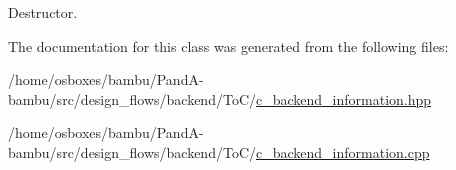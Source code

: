 Destructor. 



The documentation for this class was generated from the following files\+:\begin{DoxyCompactItemize}
\item 
/home/osboxes/bambu/\+Pand\+A-\/bambu/src/design\+\_\+flows/backend/\+To\+C/\hyperlink{c__backend__information_8hpp}{c\+\_\+backend\+\_\+information.\+hpp}\item 
/home/osboxes/bambu/\+Pand\+A-\/bambu/src/design\+\_\+flows/backend/\+To\+C/\hyperlink{c__backend__information_8cpp}{c\+\_\+backend\+\_\+information.\+cpp}\end{DoxyCompactItemize}
